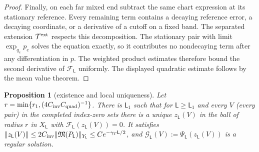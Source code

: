 \documentclass[11pt]{amsart}
\newtheorem{proposition}[theorem]{Proposition}
\theoremstyle{definition}
\theoremstyle{remark}
\theoremstyle{plain}
\numberwithin{equation}{section}
\begin{document}
\begin{proof}
Finally, on each far mixed end subtract the same chart expression
at its stationary reference. Every remaining term contains a
decaying reference error, a decaying coordinate, or a derivative
of a cutoff on a fixed band. The separated extension
$\mathcal T^{\rm ext}$ respects this decomposition. The stationary
pair with limit $\exp_{q_e}p_e$ solves the equation exactly, so
it contributes no nondecaying term after any differentiation in
$p$. The weighted product estimates therefore bound the second
derivative of $\mathcal F_\mathsf L$ uniformly. The displayed
quadratic estimate follows by the mean value theorem.
\end{proof}

\begin{proposition}[existence and local uniqueness]\label{prop:torus-existence}
Let $r=\min\{r_1,(4C_{\rm inv}C_{\rm quad})^{-1}\}$. There is $\mathsf L_1$ such that for $\mathsf L\ge \mathsf L_1$ and every
$V$ (every pair) in the completed index-zero sets there is a unique $z_{\mathsf L}(V)$ in the
ball of radius $r$ in $X_\mathsf L$ with $\mathcal F_{\mathsf L}(z_{\mathsf L}(V))=0$. It satisfies
$\|z_{\mathsf L}(V)\|\le2C_{\rm inv}\|\mathfrak M(P_\mathsf L)\|_{Y_\mathsf L}\le Ce^{-\gamma_T \mathsf L/2}$, and
$\mathcal G_{\mathsf L}(V):=\Psi_{\mathsf L}(z_{\mathsf L}(V))$ is a regular solution.
\end{proposition}
\end{document}
